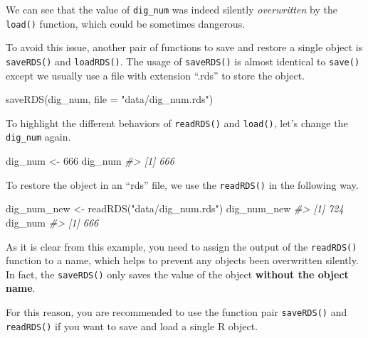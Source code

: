 \documentclass[
]{book}
\newenvironment{Shaded}{\begin{snugshade}}{\end{snugshade}}
\newcommand{\AttributeTok}[1]{\textcolor[rgb]{0.77,0.63,0.00}{#1}}
\newcommand{\CommentTok}[1]{\textcolor[rgb]{0.56,0.35,0.01}{\textit{#1}}}
\newcommand{\DecValTok}[1]{\textcolor[rgb]{0.00,0.00,0.81}{#1}}
\newcommand{\FunctionTok}[1]{\textcolor[rgb]{0.00,0.00,0.00}{#1}}
\newcommand{\NormalTok}[1]{#1}
\newcommand{\OtherTok}[1]{\textcolor[rgb]{0.56,0.35,0.01}{#1}}
\newcommand{\StringTok}[1]{\textcolor[rgb]{0.31,0.60,0.02}{#1}}
\begin{document}
We can see that the value of \texttt{dig\_num} was indeed silently \emph{overwritten} by the \texttt{load()} function, which could be sometimes dangerous.

To avoid this issue, another pair of functions to save and restore a single object is \texttt{saveRDS()} and \texttt{loadRDS()}. The usage of \texttt{saveRDS()} is almost identical to \texttt{save()} except we usually use a file with extension ``.rds'' to store the object.

\begin{Shaded}
\begin{Highlighting}[]
\FunctionTok{saveRDS}\NormalTok{(dig\_num, }\AttributeTok{file =} \StringTok{"data/dig\_num.rds"}\NormalTok{)}
\end{Highlighting}
\end{Shaded}

To highlight the different behaviors of \texttt{readRDS()} and \texttt{load()}, let's change the \texttt{dig\_num} again.

\begin{Shaded}
\begin{Highlighting}[]
\NormalTok{dig\_num }\OtherTok{\textless{}{-}} \DecValTok{666}
\NormalTok{dig\_num}
\CommentTok{\#\textgreater{} [1] 666}
\end{Highlighting}
\end{Shaded}

To restore the object in an ``rds'' file, we use the \texttt{readRDS()} in the following way.

\begin{Shaded}
\begin{Highlighting}[]
\NormalTok{dig\_num\_new }\OtherTok{\textless{}{-}} \FunctionTok{readRDS}\NormalTok{(}\StringTok{"data/dig\_num.rds"}\NormalTok{)}
\NormalTok{dig\_num\_new}
\CommentTok{\#\textgreater{} [1] 724}
\NormalTok{dig\_num}
\CommentTok{\#\textgreater{} [1] 666}
\end{Highlighting}
\end{Shaded}

As it is clear from this example, you need to assign the output of the \texttt{readRDS()} function to a name, which helps to prevent any objects been overwritten silently. In fact, the \texttt{saveRDS()} only saves the value of the object \textbf{without the object name}.

For this reason, you are recommended to use the function pair \texttt{saveRDS()} and \texttt{readRDS()} if you want to save and load a single R object.
\end{document}
